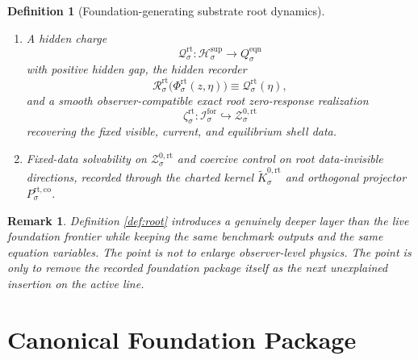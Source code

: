 \documentclass[11pt]{article}
\newcommand{\ForSpace}[1]{\mathcal I_{#1}^{\mathrm{for}}}
\newcommand{\FoundSpace}[1]{\mathcal F_{#1}^{\mathrm{fdn}}}
\newcommand{\RootProj}[1]{\Pi_{#1}^{\mathrm{rt}}}
\newcommand{\RootShellSet}[1]{\mathcal Z_{#1}^{\mathrm{rt}}}
\newcommand{\RootSupportShell}[1]{\mathcal Z_{#1}^{\mathrm{rt,sup}}}
\newcommand{\RootZeroCore}[1]{\mathcal Z_{#1}^{0,\mathrm{rt}}}
\newcommand{\RootZeroChart}[1]{\Psi_{#1}^{0,\mathrm{rt}}}
\newcommand{\RootSplit}[1]{\Phi_{#1}^{\mathrm{rt}}}
\newcommand{\RootCharge}[1]{\mathcal Q_{#1}^{\mathrm{rt}}}
\newcommand{\RootResidual}[1]{\mathcal R_{#1}^{\mathrm{rt}}}
\newcommand{\RootEmbed}[1]{\zeta_{#1}^{\mathrm{rt}}}
\newcommand{\RootKernelCh}[1]{\widetilde K_{#1}^{0,\mathrm{rt}}}
\newcommand{\RootStateComp}[1]{P_{#1}^{\mathrm{rt,co}}}
\newcommand{\SeedHidden}[1]{\mathcal H_{#1}^{\mathrm{sup}}}
\newcommand{\SeedHiddenBody}[1]{D_{#1}^{\mathrm{sup}}}
\newcommand{\EqnTarget}[1]{Q_{#1}^{\mathrm{eqn}}}
\newcommand{\EqnZero}[1]{V_{#1}^{\mathrm{eqn},0}}
\newtheorem{definition}{Definition}
\newtheorem{remark}{Remark}
\begin{document}
\begin{definition}[Foundation-generating substrate root dynamics]
\begin{enumerate}
\[    \]
    a zero chart
    \[
    \RootZeroChart{\sigma}:\RootZeroCore{\sigma}\to\EqnZero{\sigma},
    \]
    and a diffeomorphism
    \[
    \RootSplit{\sigma}:
    \RootZeroCore{\sigma}\times\SeedHiddenBody{\sigma}
    \xrightarrow{\cong}
    \RootSupportShell{\sigma}
    \]
    obeying the same zero/hidden split in the same equation variables. Assume the restrictions
    \[
    \RootProj{\sigma}\big|_{\RootShellSet{\sigma}},
    \qquad
    \RootProj{\sigma}\big|_{\RootSupportShell{\sigma}},
    \qquad
    \RootProj{\sigma}\big|_{\RootZeroCore{\sigma}}
    \]
    are diffeomorphisms onto their projected images in \(\FoundSpace{\sigma}\).
    \item A hidden charge
    \[
    \RootCharge{\sigma}:\SeedHidden{\sigma}\to\EqnTarget{\sigma}
    \]
    with positive hidden gap, the hidden recorder
    \[
    \RootResidual{\sigma}\bigl(\RootSplit{\sigma}(z,\eta)\bigr)
    \equiv
    \RootCharge{\sigma}(\eta),
    \]
    and a smooth observer-compatible exact root zero-response realization
    \[
    \RootEmbed{\sigma}:\ForSpace{\sigma}\hookrightarrow\RootZeroCore{\sigma}
    \]
    recovering the fixed visible, current, and equilibrium shell data.
    \item Fixed-data solvability on \(\RootZeroCore{\sigma}\) and coercive control on root data-invisible directions, recorded through the charted kernel \(\RootKernelCh{\sigma}\) and orthogonal projector \(\RootStateComp{\sigma}\).
\end{enumerate}
\end{definition}

\begin{remark}
Definition \ref{def:root} introduces a genuinely deeper layer than the live foundation frontier while keeping the same benchmark outputs and the same equation variables. The point is not to enlarge observer-level physics. The point is only to remove the recorded foundation package itself as the next unexplained insertion on the active line.
\end{remark}

\section{Canonical Foundation Package}
\end{document}
